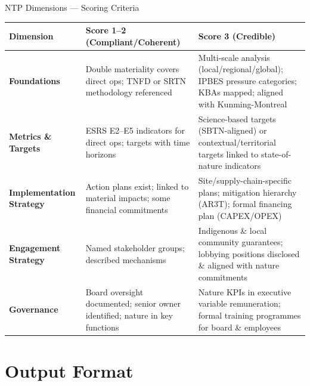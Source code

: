 \documentclass[aspectratio=169]{beamer}
\begin{document}
\begin{frame}[shrink=5]{NTP Dimensions --- Scoring Criteria}
  \scriptsize
  \begin{tabularx}{\textwidth}{p{2.9cm} X X}
    \toprule
    \textbf{Dimension} & \textbf{Score 1--2 (Compliant/Coherent)} & \textbf{Score 3 (Credible)} \\
    \midrule
    \textbf{Foundations}
      & Double materiality covers direct ops; TNFD or SRTN methodology referenced
      & Multi-scale analysis (local/regional/global); IPBES pressure categories; KBAs mapped; aligned with Kunming-Montreal \\
    \addlinespace
    \textbf{Metrics \& Targets}
      & ESRS E2--E5 indicators for direct ops; targets with time horizons
      & Science-based targets (SBTN-aligned) or contextual/territorial targets linked to state-of-nature indicators \\
    \addlinespace
    \textbf{Implementation Strategy}
      & Action plans exist; linked to material impacts; some financial commitments
      & Site/supply-chain-specific plans; mitigation hierarchy (AR3T); formal financing plan (CAPEX/OPEX) \\
    \addlinespace
    \textbf{Engagement Strategy}
      & Named stakeholder groups; described mechanisms
      & Indigenous \& local community guarantees; lobbying positions disclosed \& aligned with nature commitments \\
    \addlinespace
    \textbf{Governance}
      & Board oversight documented; senior owner identified; nature in key functions
      & Nature KPIs in executive variable remuneration; formal training programmes for board \& employees \\
    \bottomrule
  \end{tabularx}
\end{frame}

\section{Output Format}
\end{document}
